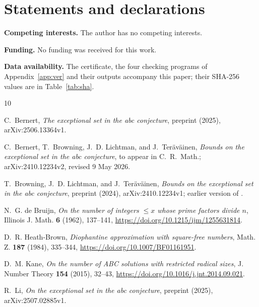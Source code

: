 \documentclass{amsart}
\numberwithin{equation}{section}
\numberwithin{table}{section}
\begin{document}
\section*{Statements and declarations}

\textbf{Competing interests.} The author has no competing interests.

\textbf{Funding.} No funding was received for this work.

\textbf{Data availability.} The certificate, the four checking programs of
Appendix~\ref{app:ver} and their outputs accompany this paper; their SHA-256
values are in Table~\ref{tab:sha}.

\begin{thebibliography}{10}

C.~Bernert, \emph{The exceptional set in the abc conjecture}, preprint (2025),
arXiv:2506.13364v1.

C.~Bernert, T.~Browning, J.~D. Lichtman, and J.~Ter\"av\"ainen,
\emph{Bounds on the exceptional set in the abc conjecture}, to appear in
C.~R.~Math.; arXiv:2410.12234v2, revised 9 May 2026.

T.~Browning, J.~D. Lichtman, and J.~Ter\"av\"ainen,
\emph{Bounds on the exceptional set in the abc conjecture}, preprint (2024),
arXiv:2410.12234v1; earlier version of \cite{BBLT}.

N.~G. de Bruijn, \emph{On the number of integers $\le x$ whose prime factors
divide $n$}, Illinois J. Math. \textbf{6} (1962), 137--141,
\url{https://doi.org/10.1215/ijm/1255631814}.

D.~R. Heath-Brown, \emph{Diophantine approximation with square-free numbers},
Math. Z. \textbf{187} (1984), 335--344,
\url{https://doi.org/10.1007/BF01161951}.

D.~M. Kane, \emph{On the number of ABC solutions with restricted radical sizes},
J. Number Theory \textbf{154} (2015), 32--43,
\url{https://doi.org/10.1016/j.jnt.2014.09.021}.

R.~Li, \emph{On the exceptional set in the abc conjecture}, preprint (2025),
arXiv:2507.02885v1.

\end{thebibliography}
\end{document}
